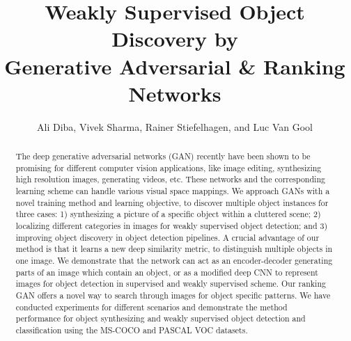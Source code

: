\documentclass[runningheads]{llncs}
\begin{document}
\pagestyle{headings}
\mainmatter

\title{Weakly Supervised Object Discovery by \\ Generative Adversarial \& Ranking Networks} 



\author{Ali Diba, Vivek Sharma, Rainer Stiefelhagen, and Luc Van Gool}








\maketitle


\begin{abstract}
The deep generative adversarial networks (GAN) recently have been shown to be promising for different computer vision applications, like image editing, synthesizing high resolution images, generating videos, etc. These networks and the corresponding learning scheme can handle various visual space mappings. We approach GANs with a novel training method and learning objective, to discover multiple object instances for three cases: 1) synthesizing a picture of a specific object within a cluttered scene; 2)  localizing different categories in images for weakly supervised object detection; and 3) improving object discovery in object detection pipelines. A crucial advantage of our method is that it learns a new deep similarity metric, to distinguish multiple objects in one image. We demonstrate that the network can act as an encoder-decoder generating parts of an image which contain an object, or as a modified deep CNN to represent images for object detection in supervised and weakly supervised scheme. Our ranking GAN offers a novel way to search through images for object specific  patterns. We have conducted experiments for different scenarios and demonstrate the method performance for object synthesizing and weakly supervised object detection and classification using the MS-COCO and PASCAL VOC datasets.
\end{abstract}
\end{document}
